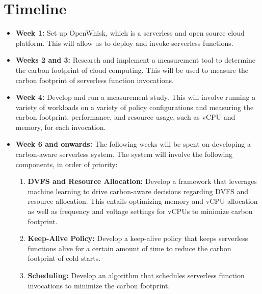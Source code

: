 \documentclass[times, 10pt]{article}
\begin{document}
\section{Timeline}
\begin{itemize}
    \item \textbf{Week 1:} Set up OpenWhisk, which is a serverless and open source cloud platform. This will allow us to deploy and invoke serverless functions.
    \item \textbf{Weeks 2 and 3:} Research and implement a measurement tool to determine the carbon footprint of cloud computing. This will be used to measure the carbon footprint of serverless function invocations.
    \item \textbf{Week 4:} Develop and run a measurement study. This will involve running a variety of workloads on a variety of policy configurations and measuring the carbon footprint, performance, and resource usage, such as vCPU and memory, for each invocation.
    \item \textbf{Week 6 and onwards:} The following weeks will be spent on developing a carbon-aware serverless system. The system will involve the following components, in order of priority:
    \begin{enumerate}
      \item \textbf{DVFS and Resource Allocation:} Develop a framework that leverages machine learning to drive carbon-aware decisions regarding DVFS and resource allocation. This entails optimizing memory and vCPU allocation as well as frequency and voltage settings for vCPUs to minimize carbon footprint.
      \item \textbf{Keep-Alive Policy:} Develop a keep-alive policy that keeps serverless functions alive for a certain amount of time to reduce the carbon footprint of cold starts.
      \item \textbf{Scheduling:} Develop an algorithm that schedules serverless function invocations to minimize the carbon footprint.
    \end{enumerate}
\end{itemize}
\end{document}

